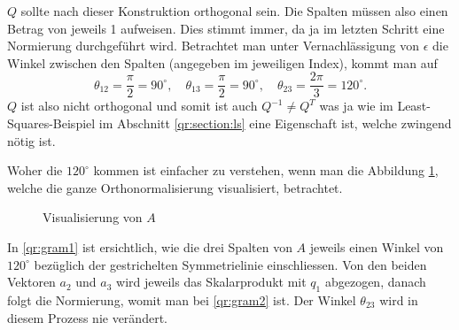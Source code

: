 $Q$ sollte nach dieser Konstruktion orthogonal sein.
Die Spalten müssen also einen Betrag von jeweils 1 aufweisen. 
Dies stimmt immer, da ja im letzten Schritt eine Normierung durchgeführt wird.
Betrachtet man unter Vernachlässigung von $\epsilon$ die Winkel zwischen den Spalten (angegeben im jeweiligen Index), kommt man auf
\begin{equation*}
\theta_{12}=\frac{\pi}{2}=90^\circ,\quad \theta_{13}=\frac{\pi}{2}=90^\circ, \quad \theta_{23}=\frac{2\pi}{3}=120^\circ.
\end{equation*}
$Q$ ist also nicht orthogonal und somit ist auch $Q^{-1}\ne Q^T$ was ja wie im Least-Squares-Beispiel im Abschnitt \ref{qr:section:ls} eine Eigenschaft ist, welche zwingend nötig ist.

Woher die $120^\circ$ kommen ist einfacher zu verstehen, wenn man die Abbildung \ref{qr:gram}, welche die ganze Orthonormalisierung visualisiert, betrachtet.
\begin{figure}[ht]
	\centering
	\caption{Visualisierung von $A$\label{qr:gram}}
\end{figure}
In \ref{qr:gram1} ist ersichtlich, wie die drei Spalten von $A$ jeweils einen Winkel von $120^\circ$ bezüglich der gestrichelten Symmetrielinie einschliessen.
Von den beiden Vektoren $a_2$ und $a_3$ wird jeweils das Skalarprodukt mit $q_1$ abgezogen, danach folgt die Normierung, womit man bei \ref{qr:gram2} ist.
Der Winkel $\theta_{23}$ wird in diesem Prozess nie verändert.

